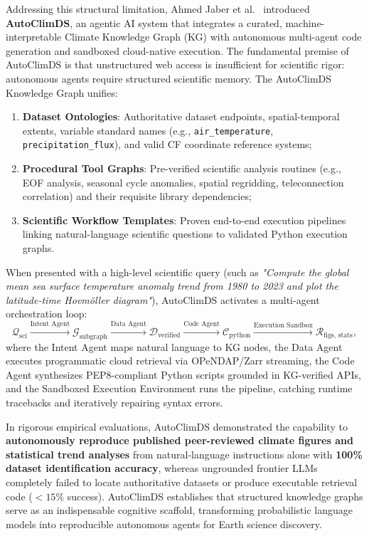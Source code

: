 Addressing this structural limitation, Ahmed Jaber et al.~\cite{jaber2025autoclimds} introduced \textbf{AutoClimDS}, an agentic AI system that integrates a curated, machine-interpretable Climate Knowledge Graph (KG) with autonomous multi-agent code generation and sandboxed cloud-native execution. The fundamental premise of AutoClimDS is that unstructured web access is insufficient for scientific rigor: autonomous agents require structured scientific memory. The AutoClimDS Knowledge Graph unifies:
\begin{enumerate}
    \item \textbf{Dataset Ontologies}: Authoritative dataset endpoints, spatial-temporal extents, variable standard names (e.g., \texttt{air\_temperature}, \texttt{precipitation\_flux}), and valid CF coordinate reference systems;
    \item \textbf{Procedural Tool Graphs}: Pre-verified scientific analysis routines (e.g., EOF analysis, seasonal cycle anomalies, spatial regridding, teleconnection correlation) and their requisite library dependencies;
    \item \textbf{Scientific Workflow Templates}: Proven end-to-end execution pipelines linking natural-language scientific questions to validated Python execution graphs.
\end{enumerate}

When presented with a high-level scientific query (such as \textit{"Compute the global mean sea surface temperature anomaly trend from 1980 to 2023 and plot the latitude-time Hovm\"oller diagram"}), AutoClimDS activates a multi-agent orchestration loop:
\begin{equation}
    \mathcal{Q}_{\text{sci}} \xrightarrow{\text{Intent Agent}} \mathcal{G}_{\text{subgraph}} \xrightarrow{\text{Data Agent}} \mathcal{D}_{\text{verified}} \xrightarrow{\text{Code Agent}} \mathcal{C}_{\text{python}} \xrightarrow{\text{Execution Sandbox}} \mathcal{R}_{\text{figs, stats}},
\end{equation}
where the Intent Agent maps natural language to KG nodes, the Data Agent executes programmatic cloud retrieval via OPeNDAP/Zarr streaming, the Code Agent synthesizes PEP8-compliant Python scripts grounded in KG-verified APIs, and the Sandboxed Execution Environment runs the pipeline, catching runtime tracebacks and iteratively repairing syntax errors.

In rigorous empirical evaluations, AutoClimDS demonstrated the capability to \textbf{autonomously reproduce published peer-reviewed climate figures and statistical trend analyses} from natural-language instructions alone with \textbf{100\% dataset identification accuracy}, whereas ungrounded frontier LLMs completely failed to locate authoritative datasets or produce executable retrieval code ($<15\%$ success). AutoClimDS establishes that structured knowledge graphs serve as an indispensable cognitive scaffold, transforming probabilistic language models into reproducible autonomous agents for Earth science discovery.



